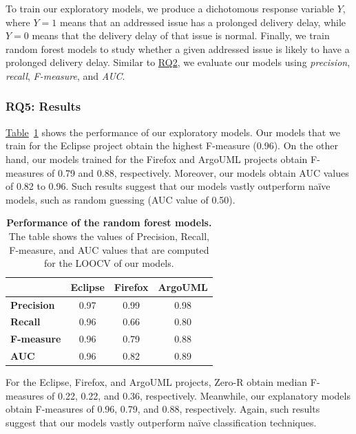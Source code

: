 To train our exploratory models, we produce a dichotomous response variable $Y$,
where $Y=1$ means that an addressed issue has a prolonged delivery delay, while $Y=0$
means that the delivery delay of that issue is normal. Finally, we train
random forest models to study whether a given addressed issue is likely to have a
prolonged delivery delay. Similar to \hyperref[ch4:rq2]{RQ2}, we evaluate our models
using \textit{precision}, \textit{recall}, \textit{F-measure}, and \textit{AUC}.

\subsubsection*{RQ5: Results}

\noindent\DIFdelbegin \textit{\textbf{}%
}
\DIFdelend \DIFaddbegin {}
\DIFaddend \hyperref[ch4:tbl:RFclassificationResult_ab]{Table}~\ref{ch4:tbl:RFclassificationResult_ab}
shows the performance of our exploratory models. Our models that we train for
the Eclipse project obtain the highest F-measure (0.96). On the other hand, our
models trained for the Firefox and ArgoUML projects obtain F-measures of 0.79
and 0.88, respectively. Moreover, our models obtain AUC values of 0.82 to 0.96.
Such results suggest that our models vastly outperform na\"{i}ve models, such as
random guessing (AUC value of 0.50).  \\

\begin{table}[t!]
	\footnotesize
	\centering
	\caption{\textbf{Performance of the random forest models.} The table
		shows the values of Precision, Recall, F-measure, and AUC values that
	are computed for the LOOCV of our models.}
	\label{ch4:tbl:RFclassificationResult_ab}
	\begin{tabular}{lccc}
		\cline{2-4} 
		& \textbf{Eclipse} & \textbf{Firefox} & \textbf{ArgoUML}\tabularnewline
		\hline 
		\textbf{Precision} & 0.97 & 0.99 & 0.98\tabularnewline
		\hline 
		\textbf{Recall} & 0.96 & 0.66 & 0.80\tabularnewline
		\hline 
		\textbf{F-measure} & 0.96 & 0.79 & 0.88\tabularnewline
		\hline 
		\textbf{AUC} & 0.96 & 0.82 & 0.89\tabularnewline
		\hline 
	\end{tabular}
\end{table}

\noindent\DIFdelbegin \textit{\textbf{}%
} %
\DIFdelend \DIFaddbegin {} \DIFaddend For the Eclipse, Firefox, and ArgoUML projects, Zero-R obtain median F-measures
of 0.22, 0.22, and 0.36, respectively. Meanwhile, our explanatory models obtain
F-measures of 0.96, 0.79, and 0.88, respectively. Again, such results suggest
that our models vastly outperform na\"{i}ve classification techniques.  \\

